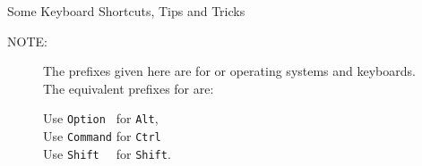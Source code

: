 \documentclass[11pt]{article}
\begin{document}
\begin{center}
  \Large Some \RStudio  Keyboard Shortcuts, Tips and Tricks
\end{center}
\begin{description}
\item[NOTE:] The prefixes given here are for \Windows or \Linux
  operating systems and keyboards.\\
  The equivalent prefixes for \MacOS are:

  Use \verb|Option | for \verb|Alt|,\\
  Use \verb|Command| for \verb|Ctrl|\\
  Use \verb|Shift  | for \verb|Shift|.
\end{description}
\end{document}
